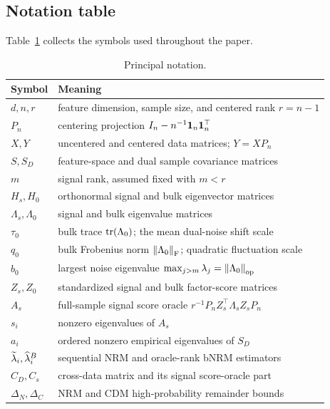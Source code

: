 \subsection{Notation table}
Table~\ref{tab:notation} collects the symbols used throughout the paper.
\begin{table}[ht]
\centering
\caption{Principal notation.}\label{tab:notation}
\small
\begin{tabular}{@{}p{}p{}@{}}
\toprule
Symbol & Meaning \\
\midrule
$d,n,r$ & feature dimension, sample size, and centered rank $r=n-1$ \\
$P_n$ & centering projection $I_n-n^{-1}\mathbf{1}_n\mathbf{1}_n^\top$ \\
$X,Y$ & uncentered and centered data matrices; $Y=XP_n$ \\
$S,S_D$ & feature-space and dual sample covariance matrices \\
$m$ & signal rank, assumed fixed with $m<r$ \\
$H_s,H_0$ & orthonormal signal and bulk eigenvector matrices \\
$\Lambda_s,\Lambda_0$ & signal and bulk eigenvalue matrices \\
$\tau_0$ & bulk trace $\operatorname{tr}(\Lambda_0)$; the mean dual-noise shift scale \\
$q_0$ & bulk Frobenius norm $\left\lVert\Lambda_0\right\rVert_{\mathrm{F}}$; quadratic fluctuation scale \\
$b_0$ & largest noise eigenvalue $\max_{j>m}\lambda_j=\left\lVert\Lambda_0\right\rVert_{\mathrm{op}}$ \\
$Z_s,Z_0$ & standardized signal and bulk factor-score matrices \\
$A_s$ & full-sample signal score oracle $r^{-1}P_nZ_s^\top\Lambda_sZ_sP_n$ \\
$s_i$ & nonzero eigenvalues of $A_s$ \\
$a_i$ & ordered nonzero empirical eigenvalues of $S_D$ \\
$\widetilde{\lambda}_i,\widehat{\lambda}_i^B$ & sequential NRM and oracle-rank bNRM estimators \\
$C_D,C_s$ & cross-data matrix and its signal score-oracle part \\
$\Delta_N,\Delta_C$ & NRM and CDM high-probability remainder bounds \\
\bottomrule
\end{tabular}
\end{table}
